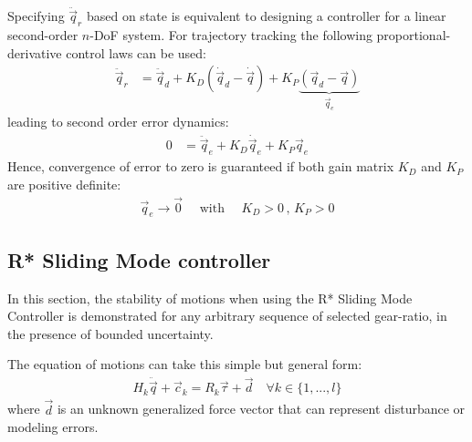 Specifying $\ddot{\vec{q}}_r$ based on state is equivalent to designing a controller for a linear second-order $n$-DoF system. For trajectory tracking the following proportional-derivative control laws can be used:
\begin{align}
\ddot{\vec{q}}_r &= \ddot{\vec{q}}_d + K_D ( \dot{\vec{q}}_d - \dot{\vec{q}} ) + K_P \underbrace{( \vec{q}_d - \vec{q} ) }_{\vec{q}_e}
\end{align}
leading to second order error dynamics:
\begin{align}
0 &= \ddot{\vec{q}}_e + K_D \dot{\vec{q}}_e + K_P \vec{q}_e
\end{align}
Hence, convergence of error to zero is guaranteed if both gain matrix $K_D$ and $K_P$ are positive definite:
\begin{align}
\vec{q}_e \rightarrow \vec{0} \quad\text{ with }\quad K_D > 0 \, , \, K_P > 0
\end{align}



\newpage

\subsection{R* Sliding Mode controller}
\label{sec:stabrstar2}

In this section, the stability of motions when using the R* Sliding Mode Controller is demonstrated for any arbitrary sequence of selected gear-ratio, in the presence of bounded uncertainty.

The equation of motions can take this simple but general form:
\begin{align}
H_k \ddot{\vec{q}} + \vec{c}_k = R_k \vec{\tau} + \vec{d} \quad \forall k \in \{1,...,l\}
\label{eq:eom_kd}
\end{align}
where $\vec{d}$ is an unknown generalized force vector that can represent disturbance or modeling errors.

